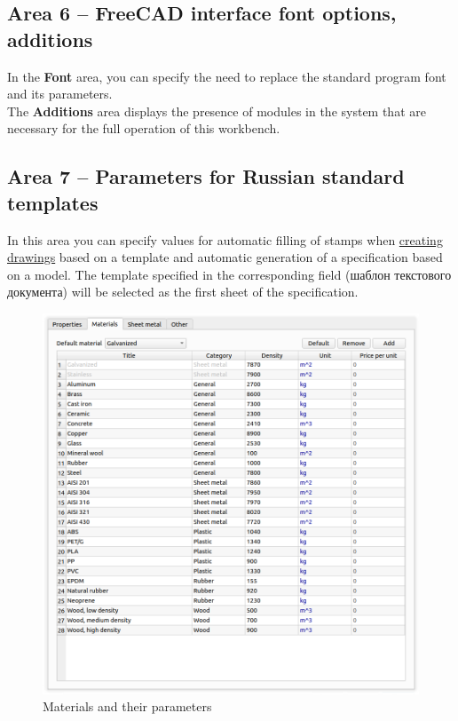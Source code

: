 \documentclass[a4paper,12pt]{article}
\begin{document}
\subsection{Area 6 -- FreeCAD interface font options, additions}
In the \textbf{Font} area, you can specify the need to replace the standard program font and its parameters.\\The \textbf{Additions} area displays the presence of modules in the system that are necessary for the full operation of this workbench.

\subsection{Area 7 -- Parameters for Russian standard templates}
In this area you can specify values ​​for automatic filling of stamps when \hyperref[sec:6]{creating drawings} based on a template and automatic generation of a specification based on a model. The template specified in the corresponding field (шаблон текстового документа) will be selected as the first sheet of the specification.

\pagebreak




\begin{figure}[htp]
	\centering
	\includegraphics[width=1\textwidth]{img/pref_materials.png}
	\caption{Materials and their parameters}
	\label{sec:pref_materials}
\end{figure}
\end{document}
